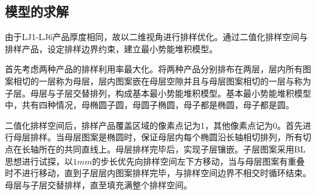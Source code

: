 \documentclass{whutmod}
\begin{document}
		\subsection{模型的求解}
		由于LJ1-LJ6产品厚度相同，故以二维视角进行排样优化。通过二值化排样空间与排样产品，设定排样边界约束，建立最小势能堆积模型。
		
		首先考虑两种产品的排样利用率最大化。将两种产品分别排布在两层，层内所有图案相切的一层称为母层，层内图案嵌在母层空隙并且与母层图案相切的一层与称为子层。母层与子层交替排列，构成基本最小势能堆积模型。基本最小势能堆积模型中，共有四种情况，母椭圆子圆，母圆子椭圆，母子都是椭圆，母子都是圆。
		
		二值化排样空间后，排样产品覆盖区域的像素点记为1，其他像素点记为0。首先进行母层排样。当母层图案是椭圆时，保证母层内每个椭圆沿长轴相切排列，所有切点在长轴所在的共同直线上。母层排样完毕后，实现子层镶嵌。子层图案采用BL思想进行试探，以$1mm$的步长优先向排样空间左下方移动，当与母层图案有重叠时不进行移动，直到子层层内图案排样完毕，与排样空间边界不相交时循环结束。母层与子层交替排样，直至填充满整个排样空间。
\end{document}
